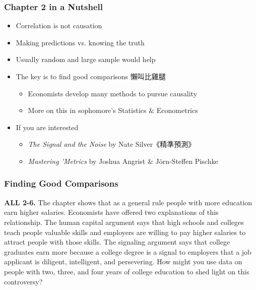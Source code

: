 \documentclass[12pt, xcolor=dvipsnames]{beamer}
\begin{document}
\begin{frame}
\frametitle{\bf Chapter 2 in a Nutshell}
\begin{itemize}
\item Correlation is not causation
\item Making predictions vs. knowing the truth
\item Usually random and large sample would help
\item The key is to find good comparisons 懶叫比雞腿
\begin{itemize}
\item Economists develop many methods to pursue causality
\item More on this in sophomore's Statistics \& Econometrics
\end{itemize}
\item If you are interested
\begin{itemize}
\item {\it The Signal and the Noise} by Nate Silver《精準預測》
\item {\it Mastering 'Metrics} by Joshua Angrist \& Jörn-Steffen Pischke
\end{itemize}
\end{itemize}
\end{frame}


\begin{frame}
\frametitle{\bf Finding Good Comparisons}
\small \textsf{\bfseries ALL 2-6.} The chapter shows that as a general rule people with more education earn higher salaries. Economists have offered two explanations of this relationship. The human capital argument says that high schools and colleges teach people valuable skills and employers are willing to pay higher salaries to attract people with those skills. The signaling argument says that college graduates earn more because a college degree is a signal to employers that a job applicant is diligent, intelligent, and persevering. How might you use data on people with two, three, and four years of college education to shed light on this controversy?
\end{frame}
\end{document}
